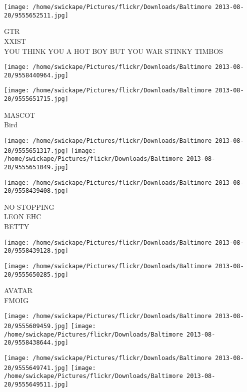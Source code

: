 \documentclass[10pt,letterpaper]{article}
\begin{document}
\texttt{[image: /home/swickape/Pictures/flickr/Downloads/Baltimore 2013-08-20/9555652511.jpg]}

GTR\\
XXIST\\
YOU THINK YOU A HOT BOY BUT YOU WAR STINKY TIMBOS\\
\pagebreak

\texttt{[image: /home/swickape/Pictures/flickr/Downloads/Baltimore 2013-08-20/9558440964.jpg]}

\vspace{0.25in}
\texttt{[image: /home/swickape/Pictures/flickr/Downloads/Baltimore 2013-08-20/9555651715.jpg]}

MASCOT\\
Bird\\
\pagebreak

\texttt{[image: /home/swickape/Pictures/flickr/Downloads/Baltimore 2013-08-20/9555651317.jpg]}
\texttt{[image: /home/swickape/Pictures/flickr/Downloads/Baltimore 2013-08-20/9555651049.jpg]}

\vspace{0.25in}
\texttt{[image: /home/swickape/Pictures/flickr/Downloads/Baltimore 2013-08-20/9558439408.jpg]}

NO STOPPING\\
LEON EHC\\
BETTY\\
\pagebreak

\texttt{[image: /home/swickape/Pictures/flickr/Downloads/Baltimore 2013-08-20/9558439128.jpg]}

\vspace{0.25in}
\texttt{[image: /home/swickape/Pictures/flickr/Downloads/Baltimore 2013-08-20/9555650285.jpg]}

AVATAR\\
FMOIG\\
\pagebreak

\texttt{[image: /home/swickape/Pictures/flickr/Downloads/Baltimore 2013-08-20/9555609459.jpg]}
\texttt{[image: /home/swickape/Pictures/flickr/Downloads/Baltimore 2013-08-20/9558438644.jpg]}

\texttt{[image: /home/swickape/Pictures/flickr/Downloads/Baltimore 2013-08-20/9555649741.jpg]}
\texttt{[image: /home/swickape/Pictures/flickr/Downloads/Baltimore 2013-08-20/9555649511.jpg]}
\end{document}
